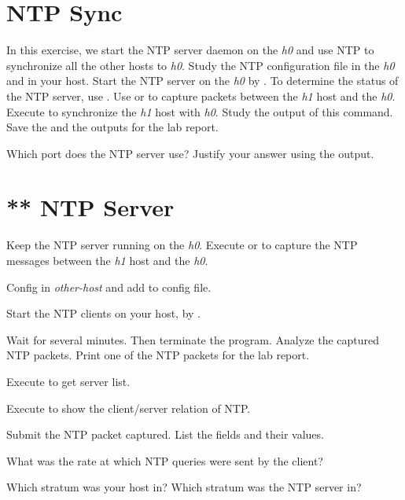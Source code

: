 \documentclass{../UTNetLab}
\begin{document}
\section{NTP Sync}
In this exercise, we start the NTP server daemon on the \textit{h0} and use NTP to synchronize all the other hosts to \textit{h0}.
Study the NTP configuration file  in the \textit{h0} and in your host.
Start the NTP server on the \textit{h0} by .
To determine the status of the NTP server, use .
Use  or  to capture packets between the \textit{h1} host and the \textit{h0}.
Execute  to synchronize the \textit{h1} host with \textit{h0}.
Study the output of this command.
Save the  and the  outputs for the lab report.

\begin{report}
    \item Which port does the NTP server use?
    Justify your answer using the  output.
\end{report}

\section{** NTP Server}
Keep the NTP server running on the \textit{h0}.
Execute  or  to capture the NTP messages between the \textit{h1} host and the \textit{h0}.

Config  in \textit{other-host} and add  to config file.

Start the NTP clients on your host, by .

Wait for several minutes.
Then terminate the  program.
Analyze the captured NTP packets.
Print one of the NTP packets for the lab report.

Execute  to get  server list.

Execute  to show the client/server relation of NTP.

\begin{report}
    \item Submit the NTP packet captured.
    List the fields and their values.

    \item What was the rate at which NTP queries were sent by the client?

    \item Which stratum was your host in? Which stratum was the NTP server in?
\end{report}
\end{document}

